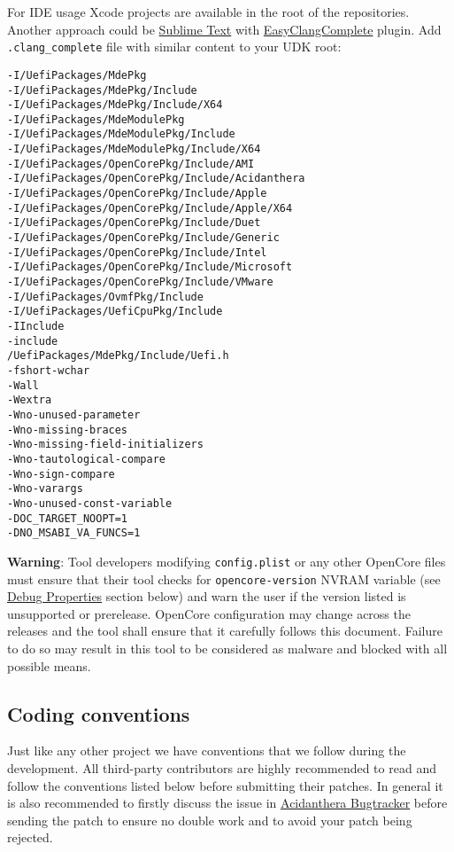 \documentclass[]{article}
\begin{document}
For IDE usage Xcode projects are available in the root of the repositories. Another
approach could be \href{https://www.sublimetext.com}{Sublime Text} with
\href{https://niosus.github.io/EasyClangComplete}{EasyClangComplete} plugin.
Add \texttt{.clang\_complete} file with similar content to your UDK root:

\begin{lstlisting}[caption=ECC Configuration, label=eccfile, style=ocbash]
-I/UefiPackages/MdePkg
-I/UefiPackages/MdePkg/Include
-I/UefiPackages/MdePkg/Include/X64
-I/UefiPackages/MdeModulePkg
-I/UefiPackages/MdeModulePkg/Include
-I/UefiPackages/MdeModulePkg/Include/X64
-I/UefiPackages/OpenCorePkg/Include/AMI
-I/UefiPackages/OpenCorePkg/Include/Acidanthera
-I/UefiPackages/OpenCorePkg/Include/Apple
-I/UefiPackages/OpenCorePkg/Include/Apple/X64
-I/UefiPackages/OpenCorePkg/Include/Duet
-I/UefiPackages/OpenCorePkg/Include/Generic
-I/UefiPackages/OpenCorePkg/Include/Intel
-I/UefiPackages/OpenCorePkg/Include/Microsoft
-I/UefiPackages/OpenCorePkg/Include/VMware
-I/UefiPackages/OvmfPkg/Include
-I/UefiPackages/UefiCpuPkg/Include
-IInclude
-include
/UefiPackages/MdePkg/Include/Uefi.h
-fshort-wchar
-Wall
-Wextra
-Wno-unused-parameter
-Wno-missing-braces
-Wno-missing-field-initializers
-Wno-tautological-compare
-Wno-sign-compare
-Wno-varargs
-Wno-unused-const-variable
-DOC_TARGET_NOOPT=1
-DNO_MSABI_VA_FUNCS=1
\end{lstlisting}

\textbf{Warning}: Tool developers modifying \texttt{config.plist} or any other OpenCore
files must ensure that their tool checks for \texttt{opencore-version} NVRAM variable
(see \hyperref[miscdebugprops]{Debug Properties} section below) and warn the user
if the version listed is unsupported or prerelease. OpenCore configuration may change
across the releases and the tool shall ensure that it carefully follows this document.
Failure to do so may result in this tool to be considered as malware and blocked with
all possible means.

\subsection{Coding conventions}\label{configuration-conv}

Just like any other project we have conventions that we follow during the development.
All third-party contributors are highly recommended to read and follow the conventions
listed below before submitting their patches. In general it is also recommended to firstly
discuss the issue in \href{https://github.com/acidanthera/bugtracker}{Acidanthera Bugtracker}
before sending the patch to ensure no double work and to avoid your patch being rejected.
\end{document}
